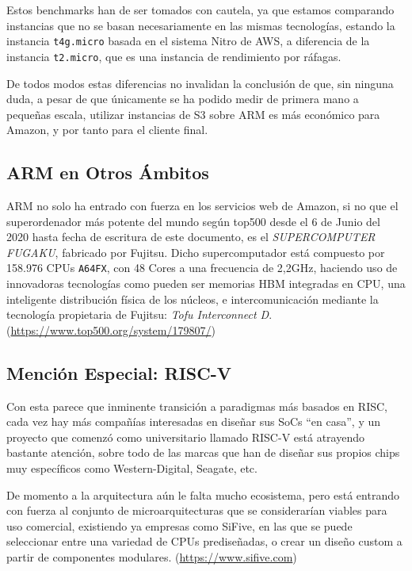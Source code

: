 \documentclass[a4paper,openright,12pt]{article}
\begin{document}
Estos benchmarks han de ser tomados con cautela, ya que estamos comparando instancias que no se basan necesariamente en las mismas tecnologías, estando la instancia \texttt{t4g.micro}
basada en el sistema Nitro de AWS, a diferencia de la instancia \texttt{t2.micro}, que es una instancia de rendimiento por ráfagas.

De todos modos estas diferencias no invalidan la conclusión de que, sin ninguna duda, a pesar de que únicamente se ha podido medir de primera mano a pequeñas escala, utilizar instancias de S3
sobre ARM es más económico para Amazon, y por tanto para el cliente final.

\subsection{ARM en Otros Ámbitos}
ARM no solo ha entrado con fuerza en los servicios web de Amazon, si no que el superordenador más potente del mundo según top500 desde el 6 de Junio del 2020 hasta fecha de escritura de este
documento, es el \emph{SUPERCOMPUTER FUGAKU}, fabricado por Fujitsu.
Dicho supercomputador está compuesto por 158.976 CPUs \texttt{A64FX}, con 48 Cores a una frecuencia de 2,2GHz, haciendo uso de innovadoras tecnologías como pueden ser memorias \gls{HBM} integradas en CPU,
una inteligente distribución física de los núcleos, e intercomunicación mediante la tecnología propietaria de Fujitsu: \emph{Tofu Interconnect D}. (\url{https://www.top500.org/system/179807/})

\subsection{Mención Especial: RISC-V}
Con esta parece que inminente transición a paradigmas más basados en RISC, cada vez hay más compañías interesadas en diseñar sus SoCs ``en casa'', y un proyecto que comenzó como universitario
llamado RISC-V está atrayendo bastante atención, sobre todo de las marcas que han de diseñar sus propios chips muy específicos como Western-Digital, Seagate, etc.

De momento a la arquitectura aún le falta mucho ecosistema, pero está entrando con fuerza al conjunto de microarquitecturas que se considerarían viables para uso comercial, existiendo ya
empresas como SiFive, en las que se puede seleccionar entre una variedad de CPUs prediseñadas, o crear un diseño custom a partir de componentes modulares. (\url{https://www.sifive.com})

\bigskip
\end{document}

